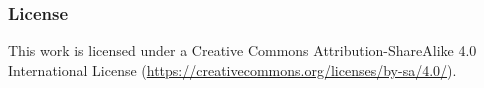 \begin{frame}[containsverbatim]\frametitle{License}
  \small
This work is licensed under a Creative Commons Attribution-ShareAlike
4.0 International License
(\url{https://creativecommons.org/licenses/by-sa/4.0/}).

\faCreativeCommons\ \faCreativeCommonsBy\ \faCreativeCommonsSa
\end{frame}
